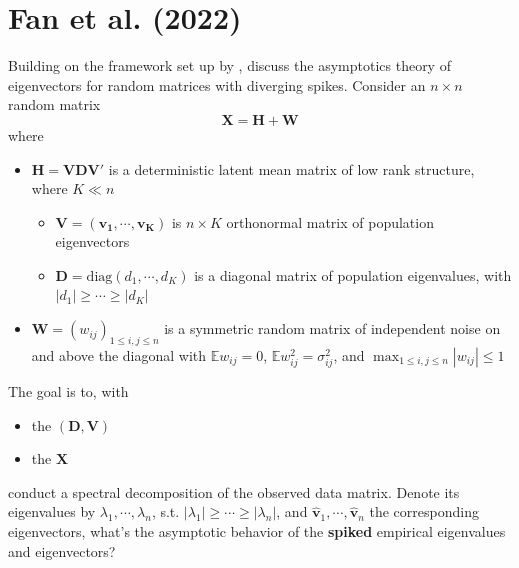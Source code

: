 \documentclass[twoside]{article}
\begin{document}
\section{Fan et al. (2022)}
Building on the framework set up by \citet{johnstone2020testing}, \citet{fan2022asymptotic} discuss the asymptotics theory of eigenvectors for random matrices with diverging spikes. Consider an $n\times n$ random matrix 
\begin{equation}
    \mathbf{X} = \mathbf{H} + \mathbf{W}
\end{equation}
where 
\begin{itemize}
    \item $\mathbf{H=VDV}'$ is a deterministic latent mean matrix of low rank structure, where $K\ll n$
    \begin{itemize}
        \item $\mathbf{V=\left(v_1,\cdots,v_K\right)}$ is $n\times K$ orthonormal matrix of population eigenvectors
        \item $\mathbf{D} = \mathrm{diag}\left(d_1,\cdots,d_K\right)$ is a diagonal matrix of population eigenvalues, with $\left\vert  d_1\right\vert\geq \cdots \geq \left\vert  d_K\right\vert$
    \end{itemize}
    \item $\mathbf{W}=\left(w_{ij}\right)_{1\leq i,j \leq n}$ is a symmetric random matrix of independent noise on and above the diagonal with $\mathbb{E}w_{ij}=0$, $\mathbb{E}w^2_{ij}=\sigma^2_{ij}$, and $\max_{1\leq i,j\leq n}\left\vert w_{ij} \right\vert \leq 1$
\end{itemize}
The goal is to, with
\begin{itemize}
    \item the  $\left(\mathbf{D},\mathbf{V}\right)$
    \item the  $\mathbf{X}$
\end{itemize}
conduct a spectral decomposition of the observed data matrix. Denote its eigenvalues by $\lambda_1,\cdots,\lambda_n$, s.t. $\left\vert \lambda_1 \right\vert \geq \cdots \geq \left\vert \lambda_n \right\vert$, and $\hat{\mathbf{v}}_1,\cdots,\hat{\mathbf{v}}_n$ the corresponding eigenvectors, what's the asymptotic behavior of the \textbf{spiked} empirical eigenvalues and eigenvectors?
 
\end{document}
